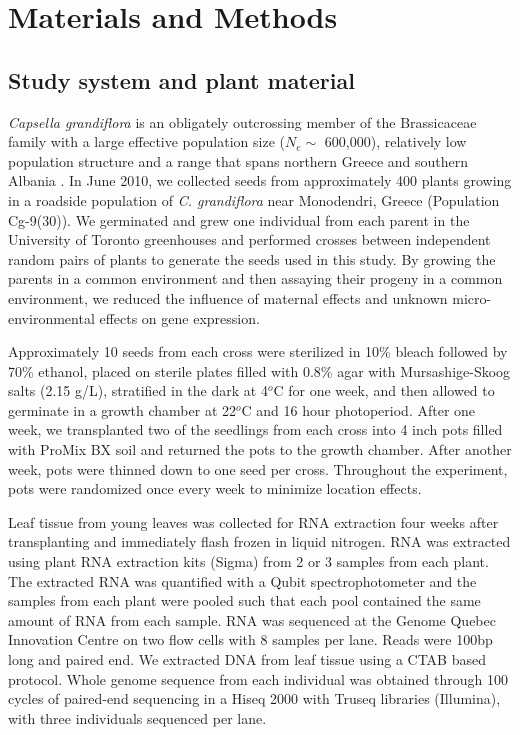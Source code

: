 \section{Materials and Methods}

\subsection{Study system and plant material}
\textit{Capsella grandiflora} is an obligately outcrossing member of the Brassicaceae family with a large effective population size ($N_{e} \sim$ 600,000), relatively low population structure and a range that spans northern Greece and southern Albania \citep{Slotte2010-gw,St_onge2011-jz}. In June 2010, we collected seeds from approximately 400 plants growing in a roadside population of \textit{C. grandiflora} near Monodendri, Greece (Population Cg-9(30)). We germinated and grew one individual from each parent in the University of Toronto greenhouses and performed crosses between independent random pairs of plants to generate the seeds used in this study. By growing the parents in a common environment and then assaying their progeny in a common environment, we reduced the influence of maternal effects and unknown micro-environmental effects on gene expression.

Approximately 10 seeds from each cross were sterilized in 10\% bleach followed by 70\% ethanol, placed on sterile plates filled with 0.8\% agar with Mursashige-Skoog salts (2.15 g/L), stratified in the dark at 4$^{o}$C for one week, and then allowed to germinate in a growth chamber at 22$^{o}$C and 16 hour photoperiod. After one week, we transplanted two of the seedlings from each cross into 4 inch pots filled with ProMix BX soil and returned the pots to the growth chamber. After another week, pots were thinned down to one seed per cross. Throughout the experiment, pots were randomized once every week to minimize location effects.

Leaf tissue from young leaves was collected for RNA extraction four weeks after transplanting and immediately flash frozen in liquid nitrogen. RNA was extracted using plant RNA extraction kits (Sigma) from 2 or 3 samples from each plant. The extracted RNA was quantified with a Qubit spectrophotometer and the samples from each plant were pooled such that each pool contained the same amount of RNA from each sample. RNA was sequenced at the Genome Quebec Innovation Centre on two flow cells with 8 samples per lane. Reads were 100bp long and paired end. We extracted DNA from leaf tissue using a CTAB based protocol. Whole genome sequence from each individual was obtained through 100 cycles of paired-end sequencing in a Hiseq 2000 with Truseq libraries (Illumina), with three individuals sequenced per lane.

